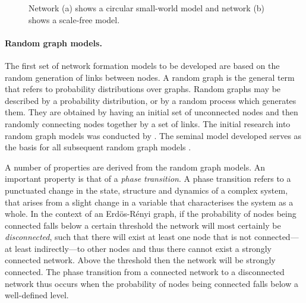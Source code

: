 \begin{figure}[t]
\begin{center}
\end{center}
\caption[Small-world and scale-free networks]{Network (a) shows a circular small-world model and network (b) shows a scale-free model.}
\end{figure}

\paragraph{Random graph models.}

The first set of network formation models to be developed are based on the random generation of links between nodes. A random graph is the general term that refers to probability distributions over graphs. Random graphs may be described by a probability distribution, or by a random process which generates them. They are obtained by having an initial set of unconnected nodes and then randomly connecting nodes together by a set of links. The initial research into random graph models was conducted by \citet{ErdosRenyi1959}. The seminal model developed serves as the basis for all subsequent random graph models \citep{Gilbert1959, Bollobas2001}.

A number of properties are derived from the random graph models. An important property is that of a \emph{phase transition}. A phase transition refers to a punctuated change in the state, structure and dynamics of a complex system, that arises from a slight change in a variable that characterises the system as a whole. In the context of an Erd\"{o}s-R\'{e}nyi graph, if the probability of nodes being connected falls below a certain threshold the network will most certainly be \emph{disconnected}, such that there will exist at least one node that is not connected---at least indirectly---to other nodes and thus there cannot exist a strongly connected network. Above the threshold then the network will be strongly connected. The phase transition from a connected network to a disconnected network thus occurs when the probability of nodes being connected falls below a well-defined level.

